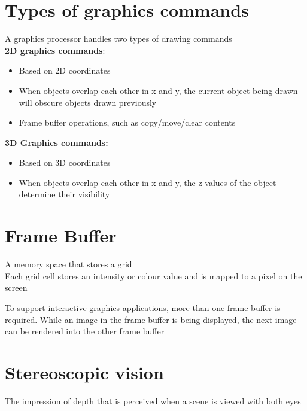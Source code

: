 \documentclass{article}[18pt]
\begin{document}
\section{Types of graphics commands}
A graphics processor handles two types of drawing commands\\
\textbf{2D graphics commands}:
\begin{itemize}
	\item Based on 2D coordinates
	\item When objects overlap each other in x and y, the current object being drawn will obscure objects drawn previously
	\item Frame buffer operations, such as copy/move/clear contents
\end{itemize}
\textbf{3D Graphics commands:}
\begin{itemize}
	\item Based on 3D coordinates
	\item When objects overlap each other in x and y, the z values of the object determine their visibility
\end{itemize}
\section{Frame Buffer}
\begin{defin}
	A memory space that stores a grid\\
	Each grid cell stores an intensity or colour value and is mapped to a pixel on the screen
\end{defin}
\begin{defin}
	To support interactive graphics applications, more than one frame buffer is required. While an image in the frame buffer is being displayed, the next image can be rendered into the other frame buffer
\end{defin}
\section{Stereoscopic vision}
\begin{defin}[Stereopsis]
The impression of depth that is perceived when a scene is viewed with both eyes
\end{defin}
\end{document}
